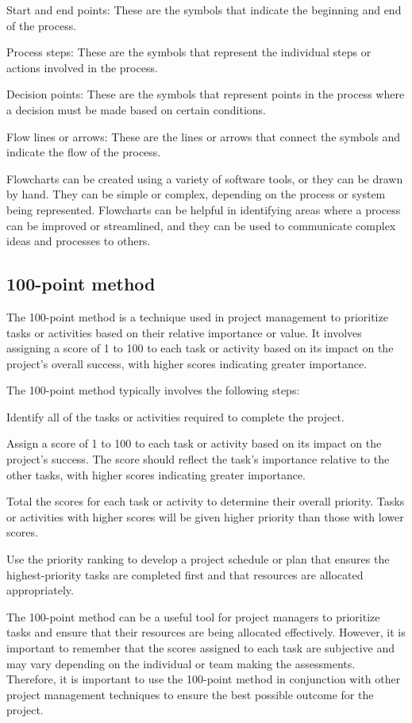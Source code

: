 \documentclass[12pt, a4paper, oneside]{article}
\begin{document}
Start and end points: These are the symbols that indicate the beginning and end of the process.

Process steps: These are the symbols that represent the individual steps or actions involved in the process.

Decision points: These are the symbols that represent points in the process where a decision must be made based on certain conditions.

Flow lines or arrows: These are the lines or arrows that connect the symbols and indicate the flow of the process.

Flowcharts can be created using a variety of software tools, or they can be drawn by hand. They can be simple or complex, depending on the process or system being represented. Flowcharts can be helpful in identifying areas where a process can be improved or streamlined, and they can be used to communicate complex ideas and processes to others.



\subsection{ 100-point method }
The 100-point method is a technique used in project management to prioritize tasks or activities based on their relative importance or value. It involves assigning a score of 1 to 100 to each task or activity based on its impact on the project's overall success, with higher scores indicating greater importance.

The 100-point method typically involves the following steps:

Identify all of the tasks or activities required to complete the project.

Assign a score of 1 to 100 to each task or activity based on its impact on the project's success. The score should reflect the task's importance relative to the other tasks, with higher scores indicating greater importance.

Total the scores for each task or activity to determine their overall priority. Tasks or activities with higher scores will be given higher priority than those with lower scores.

Use the priority ranking to develop a project schedule or plan that ensures the highest-priority tasks are completed first and that resources are allocated appropriately.

The 100-point method can be a useful tool for project managers to prioritize tasks and ensure that their resources are being allocated effectively. However, it is important to remember that the scores assigned to each task are subjective and may vary depending on the individual or team making the assessments. Therefore, it is important to use the 100-point method in conjunction with other project management techniques to ensure the best possible outcome for the project.
\end{document}
